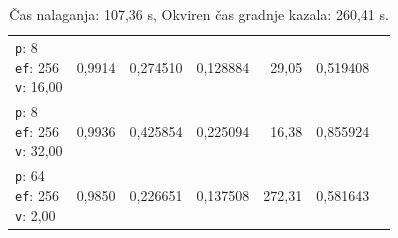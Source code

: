 \begin{table}[htbp]
\begin{tabularx}{\textwidth}{Xrrrrrr}
    \makecell{\texttt{p}: 8\\\texttt{ef}: 256\\\texttt{v}: 16,00} & 0,9914 & 0,274510 & 0,128884 & 29,05 & 0,519408 \\
    \makecell{\texttt{p}: 8\\\texttt{ef}: 256\\\texttt{v}: 32,00} & 0,9936 & 0,425854 & 0,225094 & 16,38 & 0,855924 \\
    \makecell{\texttt{p}: 64\\\texttt{ef}: 256\\\texttt{v}: 2,00} & 0,9850 & 0,226651 & 0,137508 & 272,31 & 0,581643 \\
    \bottomrule
  \end{tabularx}
\caption* {Čas nalaganja: 107,36 s, Okviren čas gradnje kazala: 260,41 s.}\end{table}

